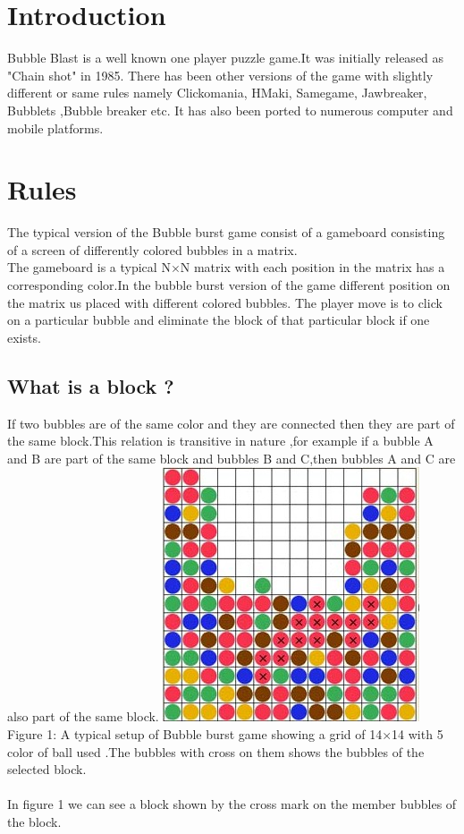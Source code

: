 \documentclass[twoside]{article}
\begin{document}
\begin{multicols}{2} %

\section{Introduction}

Bubble Blast is a well known one player  puzzle game.It was initially released as "Chain shot" in 1985. There has been other versions of the game with slightly different or same rules namely  Clickomania, HMaki, Samegame, Jawbreaker, Bubblets ,Bubble breaker etc. It has also been ported to numerous computer and mobile platforms.

\section{Rules}
The typical version of the Bubble burst game consist of a gameboard consisting of a screen of differently colored bubbles in a matrix.\\
The gameboard is a typical N$\times$N matrix with each position in the matrix  has a corresponding color.In the bubble burst version of the game different position on the matrix us placed with different colored bubbles.
The player move is to click on a particular bubble and eliminate the block of that particular block if one exists.
\subsection{What is a block ?}
If two bubbles are of the same color and they are connected then they are part of the same block.This relation is transitive in nature ,for example if a bubble A and B are part of the same block and bubbles B and  C,then bubbles A and C are also part of the same block.
\includegraphics[scale=0.70]{gameboard}
{\footnotesize Figure 1: A typical setup of Bubble burst game showing a grid of 14$\times$14 with 5 color of ball used .The bubbles with cross on them shows the bubbles of the selected block.\\}\\
In figure 1 we can see a block shown by the cross mark on the member bubbles of the block.

\end{multicols}
\end{document}
